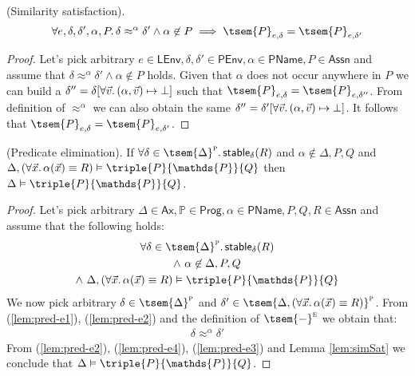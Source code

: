 \begin{lem}
	\label{lem:simSat}
	(Similarity satisfaction).
	\[
		\forall e, \delta, \delta', \alpha, P \ldotp \delta \approx^\alpha \delta' \land \alpha \not\in P \implies \tsem{P}_{e, \delta} = \tsem{P}_{e, \delta'}
	\]
	\begin{proof}
		Let's pick arbitrary $e \in \mathsf{LEnv}, \delta, \delta' \in \mathsf{PEnv}, \alpha \in \mathsf{PName}, P \in \mathsf{Assn}$ and assume that $\delta \approx^\alpha \delta' \land \alpha \not\in P$ holds. Given that $\alpha$ does not occur anywhere in $P$ we can build a $\delta'' = \delta[\forall \vec{v} \ldotp (\alpha, \vec{v}) \mapsto \bot]$ such that $\tsem{P}_{e, \delta} = \tsem{P}_{e, \delta''}$. From definition of $\approx^\alpha$ we can also obtain the same $\delta'' = \delta'[\forall \vec{v} \ldotp (\alpha, \vec{v}) \mapsto \bot]$. It follows that $\tsem{P}_{e, \delta} = \tsem{P}_{e, \delta'}$.
	\end{proof}
\end{lem}

\begin{lem}
	\label{lem:pred-e}
	(Predicate elimination).
	If $\forall \delta \in \tsem{\Delta}^\textsc{p} \ldotp \mathsf{stable}_\delta(R)$ and $\alpha \not\in \Delta, P, Q$ and $\Delta, (\forall \vec{x} \ldotp \alpha(\vec{x}) \equiv R) \vDash \triple{P}{\mathds{P}}{Q}$ then $\Delta \vDash \triple{P}{\mathds{P}}{Q}$.
	\begin{proof}
		Let's pick arbitrary $\Delta \in \mathsf{Ax}, \mathds{P} \in \mathsf{Prog}, \alpha \in \mathsf{PName}, P, Q, R \in \mathsf{Assn}$ and assume that the following holds:
		\begin{gather}
			\label{lem:pred-e1} \forall \delta \in \tsem{\Delta}^\textsc{p} \ldotp \mathsf{stable}_\delta(R) \\
			\label{lem:pred-e2} \land\ \alpha \not\in \Delta, P, Q \\
			\label{lem:pred-e4} \land\ \Delta, (\forall \vec{x} \ldotp \alpha(\vec{x}) \equiv R) \vDash \triple{P}{\mathds{P}}{Q}
		\end{gather}
		We now pick arbitrary $\delta \in \tsem{\Delta}^\textsc{p}$ and $\delta' \in \tsem{\Delta, (\forall \vec{x} \ldotp \alpha(\vec{x}) \equiv R)}^\textsc{p}$. From (\ref{lem:pred-e1}), (\ref{lem:pred-e2}) and the definition of $\tsem{-}^\textsc{e}$ we obtain that:
		\begin{gather}
			\label{lem:pred-e3} \delta \approx^\alpha \delta'
		\end{gather}
		From (\ref{lem:pred-e2}), (\ref{lem:pred-e4}), (\ref{lem:pred-e3}) and Lemma \ref{lem:simSat} we conclude that $\Delta \vDash \triple{P}{\mathds{P}}{Q}$.
	\end{proof}
\end{lem}